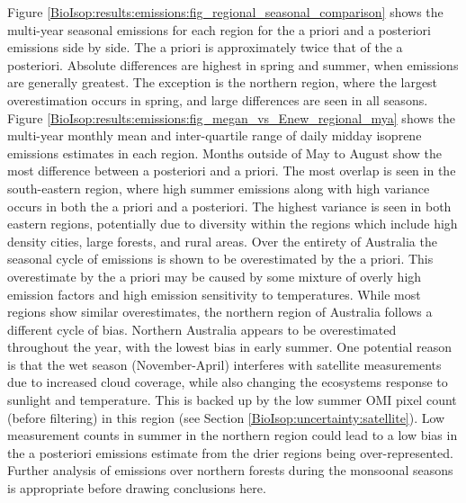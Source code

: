     
    
    Figure \ref{BioIsop:results:emissions:fig_regional_seasonal_comparison} shows the multi-year seasonal emissions for each region for the a priori and a posteriori emissions side by side.
    The a priori is approximately twice that of the a posteriori.
    Absolute differences are highest in spring and summer, when emissions are generally greatest.
    The exception is the northern region, where the largest overestimation occurs in spring, and large differences are seen in all seasons.
    Figure \ref{BioIsop:results:emissions:fig_megan_vs_Enew_regional_mya} shows the multi-year monthly mean and inter-quartile range of daily midday isoprene emissions estimates in each region. 
    Months outside of May to August show the most difference between a posteriori and a priori.
    The most overlap is seen in the south-eastern region, where high summer emissions along with high variance occurs in both the a priori and a posteriori.
    The highest variance is seen in both eastern regions, potentially due to diversity within the regions which include high density cities, large forests, and rural areas.
    Over the entirety of Australia the seasonal cycle of emissions is shown to be overestimated by the a priori.
    This overestimate by the a priori may be caused by some mixture of overly high emission factors and high emission sensitivity to temperatures.
    While most regions show similar overestimates, the northern region of Australia follows a different cycle of bias.
    Northern Australia appears to be overestimated throughout the year, with the lowest bias in early summer.
    One potential reason is that the wet season (November-April) interferes with satellite measurements due to increased cloud coverage, while also changing the ecosystems response to sunlight and temperature.
    This is backed up by the low summer OMI pixel count (before filtering) in this region (see Section \ref{BioIsop:uncertainty:satellite}).
    Low measurement counts in summer in the northern region could lead to a low bias in the a posteriori emissions estimate from the drier regions being over-represented.
    Further analysis of emissions over northern forests during the monsoonal seasons is appropriate before drawing conclusions here.
    
    
    
